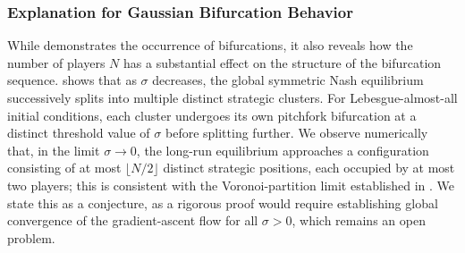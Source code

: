 \documentclass{article}
\begin{document}
            
            \subsubsection{Explanation for Gaussian Bifurcation Behavior}\label{subsubsec:SI_explanation_bifurcations}
                While  demonstrates the occurrence of bifurcations, it also reveals how the number of players $N$ has a substantial effect on the structure of the bifurcation sequence.  shows that as $\sigma$ decreases, the global symmetric Nash equilibrium successively splits into multiple distinct strategic clusters. For Lebesgue-almost-all initial conditions, each cluster undergoes its own pitchfork bifurcation at a distinct threshold value of $\sigma$ before splitting further. We observe numerically that, in the limit $\sigma \to 0$, the long-run equilibrium approaches a configuration consisting of at most $\lfloor N/2\rfloor$ distinct strategic positions, each occupied by at most two players; this is consistent with the Voronoi-partition limit established in . We state this as a conjecture, as a rigorous proof would require establishing global convergence of the gradient-ascent flow for all $\sigma > 0$, which remains an open problem.
                
\end{document}
